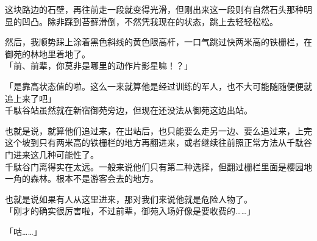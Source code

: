 这块路边的石壁，再往前走一段就变得光滑，但刚出来这一段则有自然石头那种明显的凹凸。除非踩到苔藓滑倒，不然凭我现在的状态，跳上去轻轻松松。

然后，我顺势踩上涂着黑色斜线的黄色限高杆，一口气跳过快两米高的铁栅栏，在御苑的林地里着地了。\\

「前、前辈，你莫非是哪里的动作片影星嘛！？」

「是靠高状态值的啦。这么一来就算他是经过训练的军人，也不大可能随随便便就追上来了吧」\\

千駄谷站虽然就在新宿御苑旁边，但现在还没法从御苑这边出站。

也就是说，就算他们追过来，在出站后，也只能要么走另一边、要么追过来，上完这个坡到只有两米高的铁栅栏的地方再翻进来，或者继续往前照正常方法从千駄谷门进来这几种可能性了。\\

千駄谷门离得实在太远。一般来说他们只有第二种选择，但翻过栅栏里面是樱园地一角的森林。根本不是游客会去的地方。

也就是说如果有人从这里进来，那对我们来说他就是危险人物了。\\

「刚才的确实很厉害啦，不过前辈，御苑入场好像是要收费的……」

「咕……」\\

